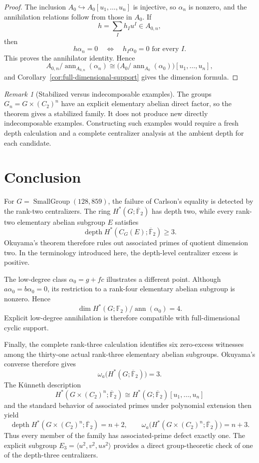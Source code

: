 \documentclass[11pt]{amsart}
\theoremstyle{definition}
\theoremstyle{remark}
\newtheorem{remark}[theorem]{Remark}
\DeclareMathOperator{\depth}{depth}
\DeclareMathOperator{\ann}{ann}
\newcommand{\F}{\mathbb F}
\newcommand{\kbar}{\overline{\mathbb F}_{2}}
\newcommand{\SG}[2]{\operatorname{SmallGroup}(#1,#2)}
\begin{document}
\begin{proof}
The inclusion $A_0\hookrightarrow A_0[u_1,\dots,u_n]$ is injective, so $\alpha_n$ is nonzero, and the annihilation relations follow from those in $A_0$.  If
\[
h=\sum_I h_Iu^I\in A_{0,n},
\]
then
\[
h\alpha_n=0
\quad\Longleftrightarrow\quad
h_I\alpha_0=0\text{ for every }I.
\]
This proves the annihilator identity.  Hence
\[
A_{0,n}/\ann_{A_{0,n}}(\alpha_n)
\cong
\bigl(A_0/\ann_{A_0}(\alpha_0)\bigr)[u_1,\dots,u_n],
\]
and Corollary~\ref{cor:full-dimensional-support} gives the dimension formula.
\end{proof}

\begin{remark}[Stabilized versus indecomposable examples]
The groups $G_n=G\times(C_2)^n$ have an explicit elementary abelian direct factor, so the theorem gives a stabilized family.  It does not produce new directly indecomposable examples.  Constructing such examples would require a fresh depth calculation and a complete centralizer analysis at the ambient depth for each candidate.
\end{remark}

\section{Conclusion}
\label{sec:conclusion}

For $G=\SG{128}{859}$, the failure of Carlson's equality is detected by the rank-two centralizers.  The ring $H^*(G;\kbar)$ has depth two, while every rank-two elementary abelian subgroup $E$ satisfies
\[
\depth H^*(C_G(E);\kbar)\geq3.
\]
Okuyama's theorem therefore rules out associated primes of quotient dimension two.  In the terminology introduced here, the depth-level centralizer excess is positive.

The low-degree class $\alpha_0=g+fc$ illustrates a different point.  Although $a\alpha_0=b\alpha_0=0$, its restriction to a rank-four elementary abelian subgroup is nonzero.  Hence
\[
\dim H^*(G;\F_2)/\ann(\alpha_0)=4.
\]
Explicit low-degree annihilation is therefore compatible with full-dimensional cyclic support.

Finally, the complete rank-three calculation identifies six zero-excess witnesses among the thirty-one actual rank-three elementary abelian subgroups.  Okuyama's converse therefore gives
\[
\omega_a\bigl(H^*(G;\kbar)\bigr)=3.
\]
The K\"unneth description
\[
H^*(G\times(C_2)^n;\kbar)
\cong H^*(G;\kbar)[u_1,\dots,u_n]
\]
and the standard behavior of associated primes under polynomial extension then yield
\[
\depth H^*(G\times(C_2)^n;\kbar)=n+2,
\qquad
\omega_a\bigl(H^*(G\times(C_2)^n;\kbar)\bigr)=n+3.
\]
Thus every member of the family has associated-prime defect exactly one.  The explicit subgroup $E_3=\langle u^2,v^2,us^2\rangle$ provides a direct group-theoretic check of one of the depth-three centralizers.
\end{document}
